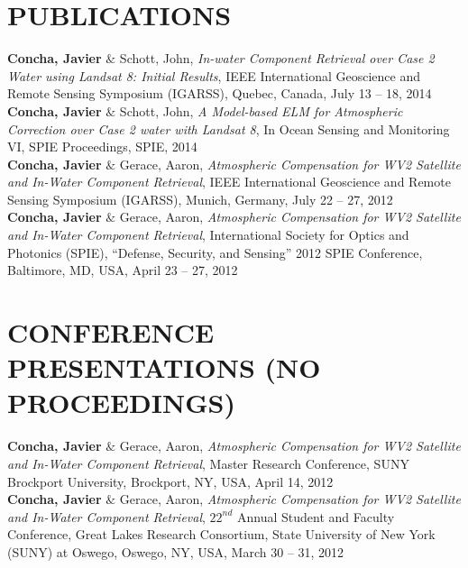 \documentclass[11pt]{res} %
\begin{document}
\begin{resume}
\vspace{-0.1in}
\section{PUBLICATIONS}
\vspace{0.1in}
{\bf Concha, Javier} $\&$ Schott, John, {\it In-water Component Retrieval over Case 2 Water using Landsat 8: Initial Results}, IEEE International Geoscience and Remote Sensing Symposium (IGARSS), Quebec, Canada, July 13 -- 18, 2014
\vspace{0.1in}\\
{\bf Concha, Javier} $\&$ Schott, John, {\it A Model-based ELM for Atmospheric Correction over Case 2 water with Landsat 8}, In Ocean Sensing and Monitoring VI, SPIE Proceedings, SPIE, 2014
\vspace{0.1in}\\
{\bf Concha, Javier} $\&$ Gerace, Aaron, {\it Atmospheric Compensation for WV2 Satellite and In-Water Component Retrieval}, IEEE International Geoscience and Remote Sensing Symposium (IGARSS), Munich, Germany, July 22 -- 27, 2012
\vspace{0.1in}\\
{\bf Concha, Javier} $\&$ Gerace, Aaron, {\it Atmospheric Compensation for WV2 Satellite and In-Water Component Retrieval}, International Society for Optics and Photonics (SPIE), ``Defense, Security, and Sensing'' 2012 SPIE Conference, Baltimore, MD, USA, April 23 -- 27, 2012\\

\vspace{-0.1in}
\section{CONFERENCE PRESENTATIONS (NO PROCEEDINGS)}
\vspace{0.1in}
{\bf Concha, Javier} $\&$ Gerace, Aaron, {\it Atmospheric Compensation for WV2 Satellite and In-Water Component Retrieval}, Master Research Conference, SUNY Brockport University, Brockport, NY, USA, April 14, 2012
\vspace{0.1in}\\
{\bf Concha, Javier} $\&$ Gerace, Aaron, {\it Atmospheric Compensation for WV2 Satellite and In-Water Component Retrieval}, $22^{nd}$ Annual Student and Faculty Conference, Great Lakes Research Consortium, State University of New York (SUNY) at Oswego, Oswego, NY, USA, March 30 -- 31, 2012\\


\end{resume}
\end{document}
